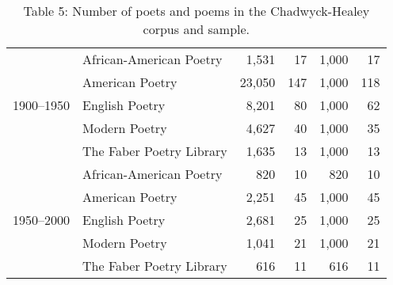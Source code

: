 \begin{table}[t]
{\begin{tabular}{llrrrr}
  \cline{1-6}
  \multirow[t]{5}{*}{1900--1950} & African-American Poetry & 1,531 & 17 & 1,000 & 17 \\
   & American Poetry & 23,050 & 147 & 1,000 & 118 \\
   & English Poetry & 8,201 & 80 & 1,000 & 62 \\
   & Modern Poetry & 4,627 & 40 & 1,000 & 35 \\
   & The Faber Poetry Library & 1,635 & 13 & 1,000 & 13 \\
  \cline{1-6}
  \multirow[t]{5}{*}{1950--2000} & African-American Poetry & 820 & 10 & 820 & 10 \\
   & American Poetry & 2,251 & 45 & 1,000 & 45 \\
   & English Poetry & 2,681 & 25 & 1,000 & 25 \\
   & Modern Poetry & 1,041 & 21 & 1,000 & 21 \\
   & The Faber Poetry Library & 616 & 11 & 616 & 11 \\
  \bottomrule
  \end{tabular}
  }
  \caption{Table 5: Number of poets and poems in the Chadwyck-Healey corpus and sample.}
  \label{tab:num_poems_corpus}
\end{table}